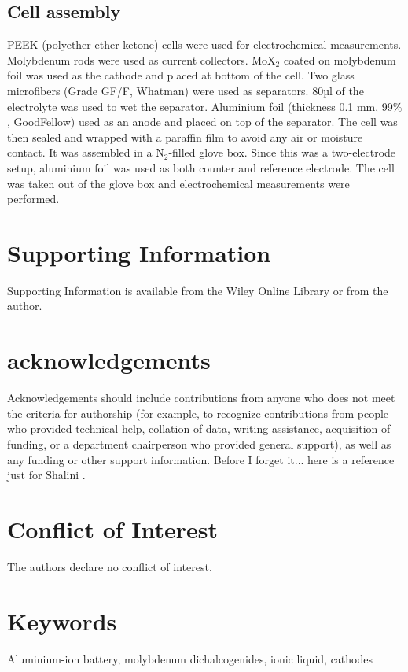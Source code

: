 \documentclass[num-refs]{wiley-article}
\begin{document}
\subsection{Cell assembly}
PEEK (polyether ether ketone) cells were used for electrochemical measurements. Molybdenum rods were used as current collectors. MoX$_2$ coated on molybdenum foil was used as the cathode and placed at bottom of the cell. Two glass microfibers (Grade GF/F, Whatman) were used as separators. 80µl of the electrolyte was used to wet the separator. Aluminium foil (thickness 0.1 mm, 99$\%$, GoodFellow) used as an anode and placed on top of the separator. The cell was then sealed and wrapped with a paraffin film to avoid any air or moisture contact. It was assembled in a N$_2$-filled glove box. Since this was a two-electrode setup, aluminium foil was used as both counter and reference electrode. The cell was taken out of the glove box and electrochemical measurements were performed. 
\section*{Supporting Information}
Supporting  Information  is  available  from  the  Wiley  Online  Library  or  from the author.

\section*{acknowledgements}
\cite{wang_binder-free_2015}
Acknowledgements should include contributions from anyone who does not meet the criteria for authorship (for example, to recognize contributions from people who provided technical help, collation of data, writing assistance, acquisition of funding, or a department chairperson who provided general support), as well as any funding or other support information. Before I forget it... here is a reference just for Shalini \cite{lahan_al3+_2019, nacimiento_exploring_2018, li_rechargeable_2018, wei_molybdenum_2017, geng_reversible_2015}.

\section*{Conflict of Interest}
The authors declare no conflict of interest.

\section*{Keywords}
Aluminium-ion battery, molybdenum dichalcogenides, ionic liquid, cathodes



\pagebreak

\end{document}
